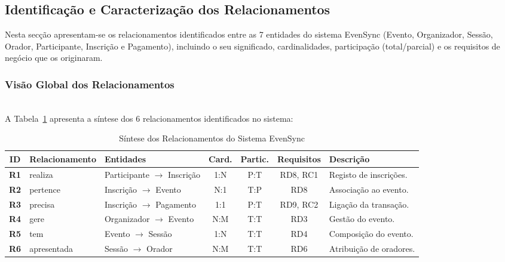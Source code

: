 \documentclass[runningheads]{llncs}
\begin{document}
                \newpage
                \subsection{Identificação e Caracterização dos Relacionamentos}
                
                Nesta secção apresentam-se os relacionamentos identificados entre as 7 entidades
                do sistema EvenSync (Evento, Organizador, Sessão, Orador, Participante, Inscrição e Pagamento), 
                incluindo o seu significado, cardinalidades, participação (total/parcial) e os 
                requisitos de negócio que os originaram.

                \subsubsection{Visão Global dos Relacionamentos}\mbox{}\\

                A Tabela~\ref{tab:relacionamentos} apresenta a síntese dos 6 relacionamentos 
                identificados no sistema:

                \begin{table}[H]
                \centering
                \renewcommand{\arraystretch}{1.3}
                \begin{tabular}{|c|l|l|c|c|c|p{}|}
                \hline
                \textbf{ID} & \textbf{Relacionamento} & \textbf{Entidades} & \textbf{Card.} & \textbf{Partic.} & \textbf{Requisitos} & \textbf{Descrição} \\ \hline
                \textbf{R1} & realiza     & Participante $\rightarrow$ Inscrição & 1:N & P:T & RD8, RC1 & Registo de inscrições. \\ \hline
                \textbf{R2} & pertence    & Inscrição $\rightarrow$ Evento       & N:1 & T:P & RD8      & Associação ao evento. \\ \hline
                \textbf{R3} & precisa     & Inscrição $\rightarrow$ Pagamento    & 1:1 & P:T & RD9, RC2 & Ligação da transação. \\ \hline
                \textbf{R4} & gere        & Organizador $\rightarrow$ Evento     & N:M & T:T & RD3      & Gestão do evento. \\ \hline
                \textbf{R5} & tem         & Evento $\rightarrow$ Sessão          & 1:N & T:T & RD4      & Composição do evento. \\ \hline
                \textbf{R6} & apresentada & Sessão $\rightarrow$ Orador          & N:M & T:T & RD6      & Atribuição de oradores. \\ \hline
                \end{tabular}
                \vspace{0.2cm}
                \caption{Síntese dos Relacionamentos do Sistema EvenSync}
                \label{tab:relacionamentos}
                \end{table}
\end{document}
